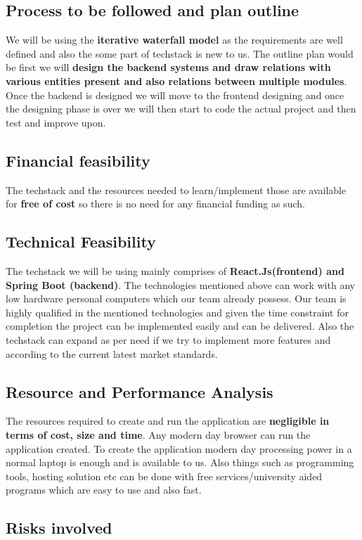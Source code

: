 \documentclass[12pt]{article}
\begin{document}
\subsection{Process to be followed and plan outline}
We will be using the \textbf{iterative waterfall model} as the requirements are well defined and also the some part of techstack is new to us. The outline plan would be first we will \textbf{design the backend systems and draw relations with various entities present and also relations between multiple modules}. Once the backend is designed we will move to the frontend designing and once the designing phase is over we will then start to code the actual project and then test and improve upon.

\subsection{Financial feasibility}
The techstack and the resources needed to learn/implement those are available for \textbf{free of cost} so there is no need for any financial funding as such.

\subsection{Technical Feasibility}
The techstack we will be using mainly comprises of \textbf{React.Js(frontend) and Spring Boot (backend)}. The technologies mentioned above can work with any low hardware personal computers which our team already possess. Our team is highly qualified in the mentioned technologies and given the time constraint for completion the project can be implemented easily and can be delivered. Also the techstack can expand as per need if we try to implement more features and according to the current latest market standards.

\subsection{Resource and Performance Analysis}
The resources required to create and run the application are \textbf{negligible in terms of cost, size and time}. Any modern day browser can run the application created. To create the application modern day processing power in a normal laptop is enough and is available to us. Also things such as programming tools, hosting solution etc can be done with free services/university aided programs which are easy to use and also fast. 

\subsection{Risks involved}
\end{document}
